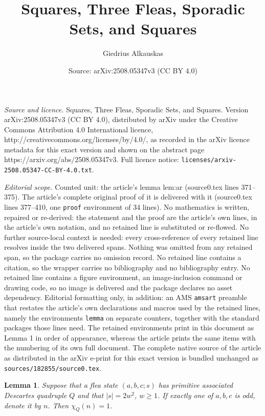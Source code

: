 \documentclass[10pt,a4paper]{amsart}
\title{Squares, Three Fleas, Sporadic Sets, and Squares}
\author{Giedrius Alkauskas}
\date{Source: arXiv:2508.05347v3 (CC BY 4.0)}
\newtheorem{lemma}{Lemma}
\begin{document}
\maketitle

\noindent\emph{Source and licence.} Squares, Three Fleas, Sporadic Sets, and Squares. Version arXiv:2508.05347v3 (CC BY 4.0), distributed by arXiv under the Creative Commons Attribution 4.0 International licence, http://creativecommons.org/licenses/by/4.0/, as recorded in the arXiv licence metadata for this exact version and shown on the abstract page https://arxiv.org/abs/2508.05347v3. Full licence notice: \texttt{licenses/arxiv-2508.05347-CC-BY-4.0.txt}.\par\smallskip

\noindent\textit{Editorial scope.} Counted unit: the article's lemma lem:ar (source0.tex lines 371--375). The article's complete original proof of it is delivered with it (source0.tex lines 377--410, one \texttt{proof} environment of 34 lines). No mathematics is written, repaired or re-derived: the statement and the proof are the article's own lines, in the article's own notation, and no retained line is substituted or re-flowed.  No further source-local context is needed: every cross-reference of every retained line resolves inside the two delivered spans.  Nothing was omitted from any retained span, so the package carries no omission record.  No retained line contains a citation, so the wrapper carries no bibliography and no bibliography entry.  No retained line contains a figure environment, an image-inclusion command or drawing code, so no image is delivered and the package declares no asset dependency.  Editorial formatting only, in addition: an AMS \texttt{amsart} preamble that restates the article's own declarations and macros used by the retained lines, namely the environments \texttt{lemma} on separate counters, together with the standard packages those lines need.  The retained environments print in this document as Lemma 1 in order of appearance, whereas the article prints the same items with the numbering of its own full document.  The complete native source of the article as distributed in the arXiv e-print for this exact version is bundled unchanged as \texttt{sources/182855/source0.tex}.
\begin{lemma}\label{lem:ar}
	Suppose that a flea state $(a,b,c;s)$ has primitive associated Descartes
	quadruple $Q$ and that $|s|=2w^2$, $w\ge1$. If exactly one of $a,b,c$ is odd,
	denote it by $n$. Then $\chi_Q(n)=1$.
\end{lemma}
\end{document}
